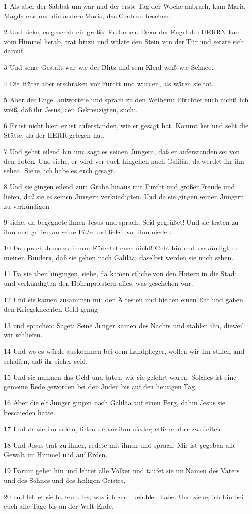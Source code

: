 \par 1 Als aber der Sabbat um war und der erste Tag der Woche anbrach, kam Maria Magdalena und die andere Maria, das Grab zu besehen.
\par 2 Und siehe, es geschah ein großes Erdbeben. Denn der Engel des HERRN kam vom Himmel herab, trat hinzu und wälzte den Stein von der Tür und setzte sich darauf.
\par 3 Und seine Gestalt war wie der Blitz und sein Kleid weiß wie Schnee.
\par 4 Die Hüter aber erschraken vor Furcht und wurden, als wären sie tot.
\par 5 Aber der Engel antwortete und sprach zu den Weibern: Fürchtet euch nicht! Ich weiß, daß ihr Jesus, den Gekreuzigten, sucht.
\par 6 Er ist nicht hier; er ist auferstanden, wie er gesagt hat. Kommt her und seht die Stätte, da der HERR gelegen hat.
\par 7 Und gehet eilend hin und sagt es seinen Jüngern, daß er auferstanden sei von den Toten. Und siehe, er wird vor euch hingehen nach Galiläa; da werdet ihr ihn sehen. Siehe, ich habe es euch gesagt.
\par 8 Und sie gingen eilend zum Grabe hinaus mit Furcht und großer Freude und liefen, daß sie es seinen Jüngern verkündigten. Und da sie gingen seinen Jüngern zu verkündigen,
\par 9 siehe, da begegnete ihnen Jesus und sprach: Seid gegrüßet! Und sie traten zu ihm und griffen an seine Füße und fielen vor ihm nieder.
\par 10 Da sprach Jesus zu ihnen: Fürchtet euch nicht! Geht hin und verkündigt es meinen Brüdern, daß sie gehen nach Galiläa; daselbst werden sie mich sehen.
\par 11 Da sie aber hingingen, siehe, da kamen etliche von den Hütern in die Stadt und verkündigten den Hohenpriestern alles, was geschehen war.
\par 12 Und sie kamen zusammen mit den Ältesten und hielten einen Rat und gaben den Kriegsknechten Geld genug
\par 13 und sprachen: Saget: Seine Jünger kamen des Nachts und stahlen ihn, dieweil wir schliefen.
\par 14 Und wo es würde auskommen bei dem Landpfleger, wollen wir ihn stillen und schaffen, daß ihr sicher seid.
\par 15 Und sie nahmen das Geld und taten, wie sie gelehrt waren. Solches ist eine gemeine Rede geworden bei den Juden bis auf den heutigen Tag.
\par 16 Aber die elf Jünger gingen nach Galiläa auf einen Berg, dahin Jesus sie beschieden hatte.
\par 17 Und da sie ihn sahen, fielen sie vor ihm nieder; etliche aber zweifelten.
\par 18 Und Jesus trat zu ihnen, redete mit ihnen und sprach: Mir ist gegeben alle Gewalt im Himmel und auf Erden.
\par 19 Darum gehet hin und lehret alle Völker und taufet sie im Namen des Vaters und des Sohnes und des heiligen Geistes,
\par 20 und lehret sie halten alles, was ich euch befohlen habe. Und siehe, ich bin bei euch alle Tage bis an der Welt Ende.

